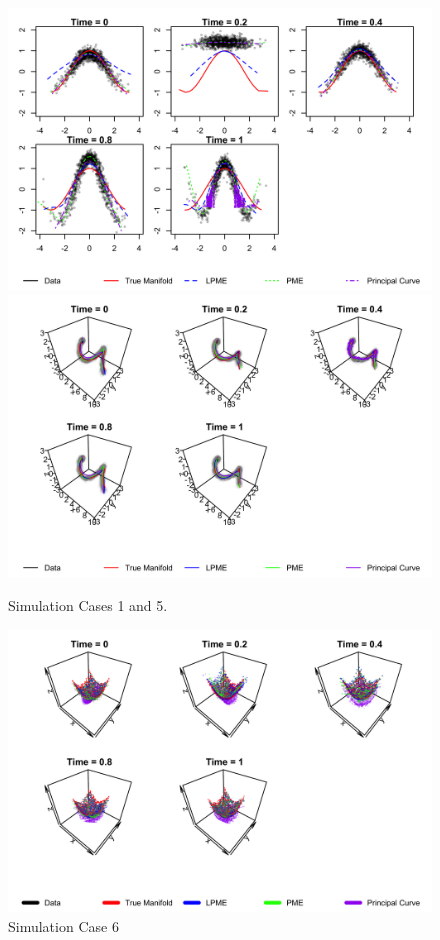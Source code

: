 \documentclass[11pt,reqno]{article}
\renewcommand{\textwidth}{180mm}
\theoremstyle{definition}
\begin{document}
\begin{figure}[h]
  \centering
  \includegraphics[width=\textwidth]{sim_case1}
  \includegraphics[width=\textwidth]{sim_case5}
  \caption{Simulation Cases 1 and 5.}
  \label{fig:sim_case1}
\end{figure}

\begin{figure}[h]
  \centering
  \includegraphics[width=\textwidth]{sim_case7}
  \caption{Simulation Case 6}
  \label{fig:sim_case6}
\end{figure}
\end{document}
